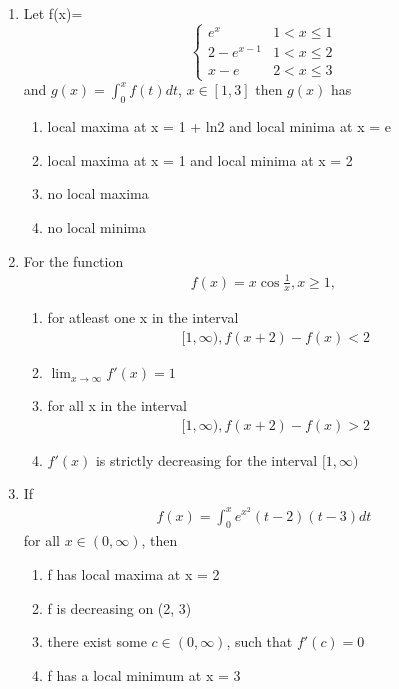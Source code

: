 \begin{enumerate}[label=\arabic*.,ref=\thesubsection.\theenumi]
\item Let 
f(x)=
\[ \begin{cases} 
      e^x &  1 < x \leq 1\\
      2 - e^{x - 1} & 1 < x \leq 2\\
      x - e & 2 < x \leq 3
   \end{cases}
\] 
and 
$g(x) = \int_{0}^{x}f(t)dt$, $x \in [1, 3]$ then $g(x)$ has 
\begin{enumerate}
\item local maxima at x = 1 + ln2 and local minima at x = e
\item local maxima at x = 1 and local minima at x = 2
\item no local maxima
\item no local minima
\end{enumerate}

\item For the function 
\begin{align*} 
f(x) = x \cos \frac{1}{x}, x \geq 1,
\end{align*}
\begin{enumerate}
\item for atleast one x in the interval 
\begin{align*}
[1, \infty), f(x + 2) - f(x) < 2
\end{align*}
\item $\lim_{x \to \infty} f'(x) = 1$
\item for all x in the interval 
\begin{align*}
[1, \infty), f(x + 2) - f(x) > 2
\end{align*}
\item $f'(x)$ is strictly decreasing for the interval $[1, \infty)$
\end{enumerate}

\item If 
\begin{align*}
f(x) = \int_{0}^{x} e^{x^2}(t - 2)(t - 3)dt
\end{align*} 
for all $x \in  (0, \infty)$, then 
\begin{enumerate}
\item f has local maxima at x = 2
\item f is decreasing on (2, 3)
\item there exist some $c \in (0, \infty)$, such that $f'(c) = 0$
\item f has a local minimum at x = 3
\end{enumerate}


\end{enumerate}
